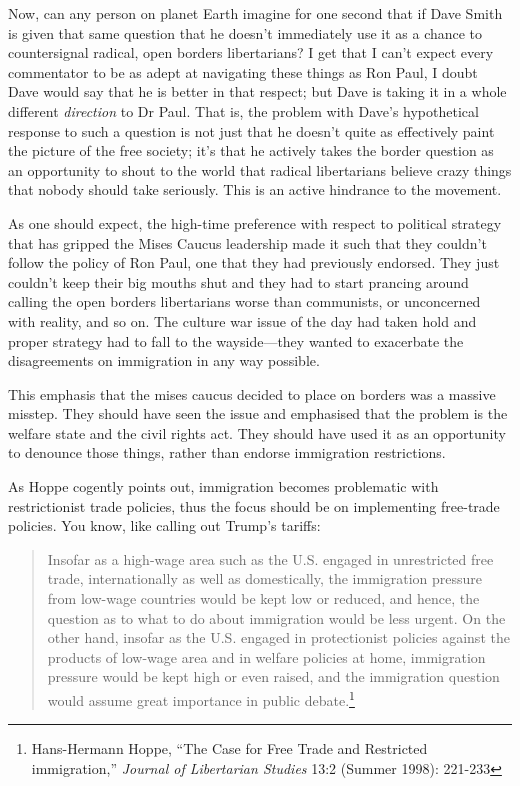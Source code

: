 \documentclass[11pt]{article}
\begin{document}
Now, can any person on planet Earth imagine for one second that if Dave Smith is given that same question that he doesn't immediately use it as a chance to countersignal radical, open borders libertarians? I get that I can't expect every commentator to be as adept at navigating these things as Ron Paul, I doubt Dave would say that he is better in that respect; but Dave is taking it in a whole different \emph{direction} to Dr Paul. That is, the problem with Dave's hypothetical response to such a question is not just that he doesn't quite as effectively paint the picture of the free society; it's that he actively takes the border question as an opportunity to shout to the world that radical libertarians believe crazy things that nobody should take seriously. This is an active hindrance to the movement.

As one should expect, the high-time preference with respect to political strategy that has gripped the Mises Caucus leadership made it such that they couldn't follow the policy of Ron Paul, one that they had previously endorsed. They just couldn't keep their big mouths shut and they had to start prancing around calling the open borders libertarians worse than communists, or unconcerned with reality, and so on. The culture war issue of the day had taken hold and proper strategy had to fall to the wayside---they wanted to exacerbate the disagreements on immigration in any way possible.

This emphasis that the mises caucus decided to place on borders was a massive misstep. They should have seen the issue and emphasised that the problem is the welfare state and the civil rights act. They should have used it as an opportunity to denounce those things, rather than endorse immigration restrictions.

As Hoppe cogently points out, immigration becomes problematic with restrictionist trade policies, thus the focus should be on implementing free-trade policies. You know, like calling out Trump's tariffs:
\begin{quote}
Insofar as a high-wage area such as the U.S. engaged in unrestricted free trade, internationally as well as domestically, the immigration pressure from low-wage countries would be kept low or reduced, and hence, the question as to what to do about immigration would be less urgent. On the other hand, insofar as the U.S. engaged in protectionist policies against the products of low-wage area and in welfare policies at home, immigration pressure would be kept high or even raised, and the immigration question would assume great importance in public debate.\footnote{Hans-Hermann Hoppe, ``The Case for Free Trade and Restricted immigration,'' \emph{Journal of Libertarian Studies} 13:2 (Summer 1998): 221-233}
\end{quote}
\end{document}
